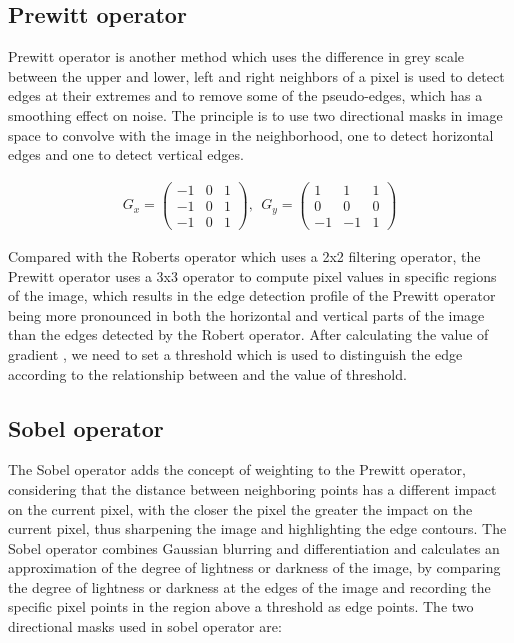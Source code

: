\documentclass[hyperref]{article}
\theoremstyle{nonumberplain}
\begin{document}
	\subsection{Prewitt operator}
	
	\hspace{1.0em}
	Prewitt operator is another method which uses the difference in grey scale between the upper and lower, left and right neighbors of a pixel is used to detect edges at their extremes and to remove some of the pseudo-edges, which has a smoothing effect on noise. The principle is to use two directional masks in image space to convolve with the image in the neighborhood, one to detect horizontal edges and one to detect vertical edges.
	
	\begin{equation}
	\begin{aligned}
	G_{x}=\begin{pmatrix}
	-1 &0  &1 \\ 
	-1 &0  &1 \\ 
	-1 &0  &1 
	\end{pmatrix}, \ \ G_{y}=\begin{pmatrix}
	1 &1  &1 \\ 
	0 &0  &0 \\ 
	-1 &-1  &1 
	\end{pmatrix}
	\end{aligned}
	\label{eq16}
	\end{equation}
	
	Compared with the Roberts operator which uses a 2x2 filtering operator, the Prewitt operator uses a 3x3 operator to compute pixel values in specific regions of the image, which results in the edge detection profile of the Prewitt operator being more pronounced in both the horizontal and vertical parts of the image than the edges detected by the Robert operator. After calculating the value of gradient , we need to set a threshold which is used to distinguish the edge according to the relationship between  and the value of threshold.
	
	\subsection{Sobel operator}
	
	\hspace{1.0em}
	The Sobel operator adds the concept of weighting to the Prewitt operator, considering that the distance between neighboring points has a different impact on the current pixel, with the closer the pixel the greater the impact on the current pixel, thus sharpening the image and highlighting the edge contours. The Sobel operator combines Gaussian blurring and differentiation and calculates an approximation of the degree of lightness or darkness of the image, by comparing the degree of lightness or darkness at the edges of the image and recording the specific pixel points in the region above a threshold as edge points. The two directional masks used in sobel operator are:
	
\end{document}
